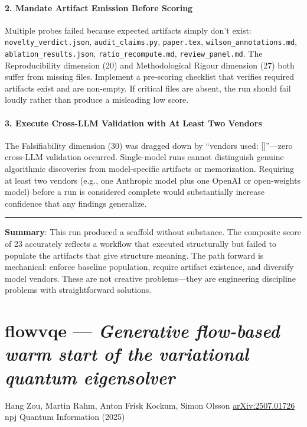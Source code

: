 \documentclass[10pt,letterpaper]{article}
\begin{document}
\hypertarget{mandate-artifact-emission-before-scoring}{%
\paragraph{2. Mandate Artifact Emission Before Scoring}\label{mandate-artifact-emission-before-scoring}}

Multiple probes failed because expected artifacts simply don't exist: \texttt{novelty\_verdict.json}, \texttt{audit\_claims.py}, \texttt{paper.tex}, \texttt{wilson\_annotations.md}, \texttt{ablation\_results.json}, \texttt{ratio\_recompute.md}, \texttt{review\_panel.md}. The Reproducibility dimension (20) and Methodological Rigour dimension (27) both suffer from missing files. Implement a pre-scoring checklist that verifies required artifacts exist and are non-empty. If critical files are absent, the run should fail loudly rather than produce a misleading low score.

\hypertarget{execute-cross-llm-validation-with-at-least-two-vendors}{%
\paragraph{3. Execute Cross-LLM Validation with At Least Two Vendors}\label{execute-cross-llm-validation-with-at-least-two-vendors}}

The Falsifiability dimension (30) was dragged down by ``vendors used: {[}{]}''---zero cross-LLM validation occurred. Single-model runs cannot distinguish genuine algorithmic discoveries from model-specific artifacts or memorization. Requiring at least two vendors (e.g., one Anthropic model plus one OpenAI or open-weights model) before a run is considered complete would substantially increase confidence that any findings generalize.

\begin{center}\rule{0.5\linewidth}{0.5pt}\end{center}

\textbf{Summary}: This run produced a scaffold without substance. The composite score of 23 accurately reflects a workflow that executed structurally but failed to populate the artifacts that give structure meaning. The path forward is mechanical: enforce baseline population, require artifact existence, and diversify model vendors. These are not creative problems---they are engineering discipline problems with straightforward solutions.


\clearpage
\section{flowvqe --- \emph{Generative flow-based warm start of the variational quantum eigensolver}}
\noindent Hang Zou, Martin Rahm, Anton Frisk Kockum, Simon Olsson \quad \href{https://arxiv.org/abs/2507.01726}{arXiv:2507.01726} \quad npj Quantum Information (2025)
\end{document}
